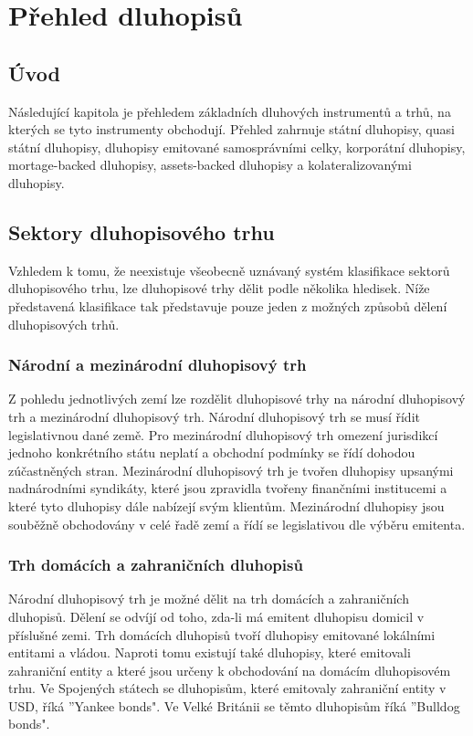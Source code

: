 \documentclass[a4paper]{book}
\begin{document}
\chapter{Přehled dluhopisů}

\section{Úvod}

Následující kapitola je přehledem základních dluhových instrumentů a trhů, na kterých se tyto instrumenty obchodují. Přehled zahrnuje státní dluhopisy, quasi státní dluhopisy, dluhopisy emitované samosprávními celky, korporátní dluhopisy, mortage-backed dluhopisy, assets-backed dluhopisy a kolateralizovanými dluhopisy.

\section{Sektory dluhopisového trhu}

Vzhledem k tomu, že neexistuje všeobecně uznávaný systém klasifikace sektorů dluhopisového trhu, lze dluhopisové trhy dělit podle několika hledisek. Níže představená klasifikace tak představuje pouze jeden z možných způsobů dělení dluhopisových trhů.

\subsection{Národní a mezinárodní dluhopisový trh}

Z pohledu jednotlivých zemí lze rozdělit dluhopisové trhy na národní dluhopisový trh a mezinárodní dluhopisový trh. Národní dluhopisový trh se musí řídit legislativnou dané země. Pro mezinárodní dluhopisový trh omezení jurisdikcí jednoho konkrétního státu neplatí a obchodní podmínky se řídí dohodou zúčastněných stran. Mezinárodní dluhopisový trh je tvořen dluhopisy upsanými nadnárodními syndikáty, které jsou zpravidla tvořeny finančními institucemi a které tyto dluhopisy dále nabízejí svým klientům. Mezinárodní dluhopisy jsou souběžně obchodovány v celé řadě zemí a řídí se legislativou dle výběru emitenta.

\subsection{Trh domácích a zahraničních dluhopisů}

Národní dluhopisový trh je možné dělit na trh domácích a zahraničních dluhopisů. Dělení se odvíjí od toho, zda-li má emitent dluhopisu domicil v příslušné zemi. Trh domácích dluhopisů tvoří dluhopisy emitované lokálními entitami a vládou. Naproti tomu existují také dluhopisy, které emitovali zahraniční entity a které jsou určeny k obchodování na domácím dluhopisovém trhu. Ve Spojených státech se dluhopisům, které emitovaly zahraniční entity v USD, říká ''Yankee bonds". Ve Velké Británii se těmto dluhopisům říká ''Bulldog bonds".
\end{document}
